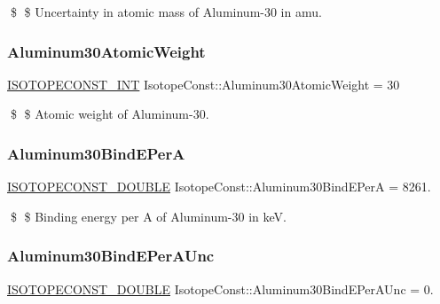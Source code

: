 \$ \$ Uncertainty in atomic mass of Aluminum-\/30 in amu. \mbox{\label{group___isotope_const-_aluminum-_al30_ga6a1a71ee6ba49e4a3dad53cde717988b}} 
\subsubsection{\texorpdfstring{Aluminum30\+Atomic\+Weight}{Aluminum30AtomicWeight}}
{\footnotesize\ttfamily \mbox{\hyperlink{group___isotope_const-_macros_ga5f18360b3e99483a35c32d789e62621c}{I\+S\+O\+T\+O\+P\+E\+C\+O\+N\+S\+T\+\_\+\+I\+NT}} Isotope\+Const\+::\+Aluminum30\+Atomic\+Weight = 30}

\$ \$ Atomic weight of Aluminum-\/30. \mbox{\label{group___isotope_const-_aluminum-_al30_ga78d5381a4200fcb1a053d18b75ae27e3}} 
\subsubsection{\texorpdfstring{Aluminum30\+Bind\+E\+PerA}{Aluminum30BindEPerA}}
{\footnotesize\ttfamily \mbox{\hyperlink{group___isotope_const-_macros_ga8f45a7272ce02c0b4c65c44636ed719a}{I\+S\+O\+T\+O\+P\+E\+C\+O\+N\+S\+T\+\_\+\+D\+O\+U\+B\+LE}} Isotope\+Const\+::\+Aluminum30\+Bind\+E\+PerA = 8261.}

\$ \$ Binding energy per A of Aluminum-\/30 in keV. \mbox{\label{group___isotope_const-_aluminum-_al30_ga9711062c069af733d702bb1ccf20466f}} 
\subsubsection{\texorpdfstring{Aluminum30\+Bind\+E\+Per\+A\+Unc}{Aluminum30BindEPerAUnc}}
{\footnotesize\ttfamily \mbox{\hyperlink{group___isotope_const-_macros_ga8f45a7272ce02c0b4c65c44636ed719a}{I\+S\+O\+T\+O\+P\+E\+C\+O\+N\+S\+T\+\_\+\+D\+O\+U\+B\+LE}} Isotope\+Const\+::\+Aluminum30\+Bind\+E\+Per\+A\+Unc = 0.}

